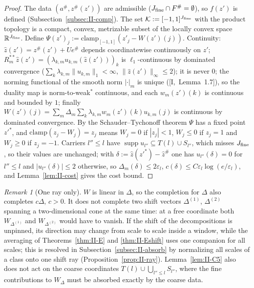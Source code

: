 \documentclass[10pt]{amsart}
\theoremstyle{definition}
\theoremstyle{remark}
\newtheorem{remark}[theorem]{Remark}
\newcommand{\supp}{\operatorname{supp}}
\newcommand{\R}{\mathbb R}
\newcommand{\zh}{\hat z}
\begin{document}
\begin{proof}
The data $(a^\#,z^\#(z'))$ are admissible ($J_{\rm fine}\cap F^\#=\emptyset$),
so $f(z')$ is defined (Subsection~\ref{subsec:II-comp}).  The set $\mathcal K:=
[-1,1]^{J_{\rm fine}}$ with the product topology is a compact, convex,
metrizable subset of the locally convex space $\R^{J_{\rm fine}}$.  Define
$\Psi(z')_j:=\mathrm{clamp}_{[-1,1]}(z'_j-W(z')(j))$.  Continuity: $\zh(z')=
z^\#(z')+Ue^\#$ depends coordinatewise continuously on $z'$; $R_m^{**}\zh(z')=
(\lambda_{k,m}u_{k,m}(\zh(z')))_k$ is $\ell_1$-continuous by dominated
convergence ($\sum_k\lambda_{k,m}\|u_{k,m}\|_1<\infty$, $\|\zh(z')\|_\infty\le2$);
it is never $0$; the norming functional of the smooth norm $|\cdot|_m$ is
unique ([I,~Lemma~1.7]), so the duality map is norm-to-weak$^*$ continuous,
and each $w_m(z')(k)$ is continuous and bounded by $1$; finally
$W(z')(j)=\sum_m\Delta_m\sum_k\lambda_{k,m}w_m(z')(k)u_{k,m}(j)$ is continuous by
dominated convergence.  By the Schauder--Tychonoff theorem $\Psi$ has a fixed
point $z'^*$, and $\mathrm{clamp}(z_j-W_j)=z_j$ means $W_j=0$ if $|z_j|<1$,
$W_j\le0$ if $z_j=1$ and $W_j\ge0$ if $z_j=-1$.  Carriers $l''\le l$ have
$\supp u_{l''}\subseteq T(l)\cup S_{l''}$, which misses $J_{\rm fine}$, so their
values are unchanged; with $\delta:=\zh(z'^*)-\zh^\#$ one has $u_{l''}(\delta)=0$
for $l''\le l$ and $|u_{l''}(\delta)|\le2$ otherwise, so $\Delta_m(\delta)\le2
\varepsilon_l$, $c(\delta)\le C\varepsilon_l\log(e/\varepsilon_l)$, and
Lemma~\ref{lem:II-cost} gives the cost bound.
\end{proof}

\begin{remark}[One ray only]\label{rem:II-C5}
$W$ is linear in $\Delta$, so the completion for $\Delta$ also completes
$c\Delta$, $c>0$.  It does not complete two shift vectors $\Delta^{(1)}$,
$\Delta^{(2)}$ spanning a two-dimensional cone at the same time: at a free
coordinate both $W_{\Delta^{(1)}}$ and $W_{\Delta^{(2)}}$ would have to vanish.
If the shift of the decompositions is unpinned, its direction may change
from scale to scale inside a window, while the averaging of
Theorems~\ref{thm:II-E} and \ref{thm:II-Eshift} uses one companion for all
scales; this is resolved in Subsection~\ref{subsec:II-absorb} by normalizing
all scales of a class onto one shift ray (Proposition~\ref{prop:II-ray}).
Lemma~\ref{lem:II-C5} also does not act on the coarse coordinates $T(l)\cup
\bigcup_{l''\le l}S_{l''}$, where the fine contributions to $W_\Delta$ must be
absorbed exactly by the coarse data.
\end{remark}
\end{document}
